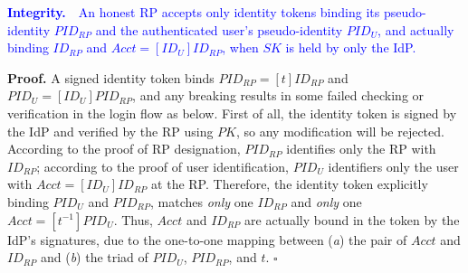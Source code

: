 %

\vspace{1mm}
\noindent\textcolor{blue}{\textbf{Integrity.}~~An honest RP accepts only identity tokens
 binding its pseudo-identity $PID_{RP}$ and the authenticated user's pseudo-identity $PID_U$,
 and actually binding $ID_{RP}$ and $Acct=[ID_U]ID_{RP}$,
 when $SK$ is held by only the IdP.}

\vspace{0.75mm}
\noindent\textbf{Proof.}
A signed identity token binds $PID_{RP} = [t]ID_{RP}$ and $PID_U = [ID_U]PID_{RP}$,
    and any breaking results in some failed checking or verification in the login flow as below.
First of all, the identity token is signed by the IdP
        and verified by the RP using $PK$,
        so any modification will be rejected.
According to the proof of RP designation,
   $PID_{RP}$ identifies only the RP with $ID_{RP}$;
   according to the proof of user identification,
    $PID_U$ identifiers only the user with $Acct = [ID_U]ID_{RP}$ at the RP.
Therefore, the identity token explicitly binding $PID_U$ and $PID_{RP}$,
    matches \emph{only} one $ID_{RP}$ and \emph{only} one $Acct = [t^{-1}]PID_{U}$.
Thus,
    $Acct$ and $ID_{RP}$ are actually bound in the token by the IdP's signatures,
        due to the one-to-one mapping between (\emph{a}) the pair of $Acct$ and $ID_{RP}$ and (\emph{b}) the triad of $PID_U$, $PID_{RP}$, and $t$. $\square$




